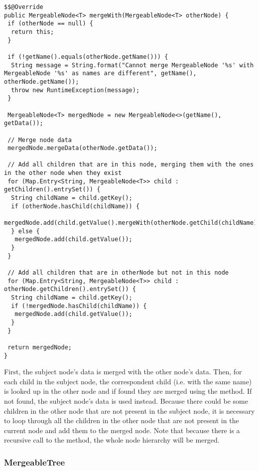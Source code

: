 \noindent\begin{minipage}[c]{\linewidth}
\begin{lstlisting}[breaklines,caption={MergeableNode mergeWith method definition},label=lis:timerecorderapi:mergeablenodemergewithmethoddefinition]
$$@Override
public MergeableNode<T> mergeWith(MergeableNode<T> otherNode) {
 if (otherNode == null) {
  return this;
 }

 if (!getName().equals(otherNode.getName())) {
  String message = String.format("Cannot merge MergeableNode '%s' with MergeableNode '%s' as names are different", getName(), otherNode.getName());
  throw new RuntimeException(message);
 }

 MergeableNode<T> mergedNode = new MergeableNode<>(getName(), getData());

 // Merge node data
 mergedNode.mergeData(otherNode.getData());

 // Add all children that are in this node, merging them with the ones in the other node when they exist
 for (Map.Entry<String, MergeableNode<T>> child : getChildren().entrySet()) {
  String childName = child.getKey();
  if (otherNode.hasChild(childName)) {
   mergedNode.add(child.getValue().mergeWith(otherNode.getChild(childName)));
  } else {
   mergedNode.add(child.getValue());
  }
 }

 // Add all children that are in otherNode but not in this node
 for (Map.Entry<String, MergeableNode<T>> child : otherNode.getChildren().entrySet()) {
  String childName = child.getKey();
  if (!mergedNode.hasChild(childName)) {
   mergedNode.add(child.getValue());
  }
 }

 return mergedNode;
}
\end{lstlisting}
\end{minipage}

\noindent First, the subject node's data is merged with the other node's data. Then, for each child in the subject node, the correspondent child (i.e. with the same name) is looked up in the other node and if found they are merged using the  method. If not found, the subject node's data is used instead. Because there could be some children in the other node that are not present in the subject node, it is necessary to loop through all the children in the other node that are not present in the current node and add them to the merged node. Note that because there is a recursive call to the  method, the whole node hierarchy will be merged.

\subsubsection{MergeableTree}


